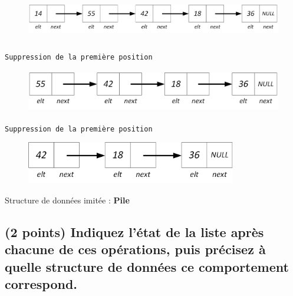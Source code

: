 \documentclass[11pt,a4paper]{article}
\begin{document}
\begin{center}
\begin{figure}[ht!]
\centering
\centerline{  %
\includegraphics[height=1.85cm]{img/p-2-Liste_p_5.png}
}
\end{figure}


\texttt{Suppression de la première position}

\begin{figure}[ht!]
\centering
\centerline{  %
\includegraphics[height=1.85cm]{img/p-1-Liste_p_4.png}
}
\end{figure}


\texttt{Suppression de la première position}

\begin{figure}[ht!]
\centering
\centerline{  %
\includegraphics[height=1.85cm]{img/Liste_p_1.png}
}
\end{figure}

\bigskip

\end{center}

Structure de données imitée : \textbf{Pile}



\clearpage

\subsection{(2 points) Indiquez l'état de la liste après chacune de ces opérations, puis précisez à quelle structure de données ce comportement correspond. }

\end{document}

